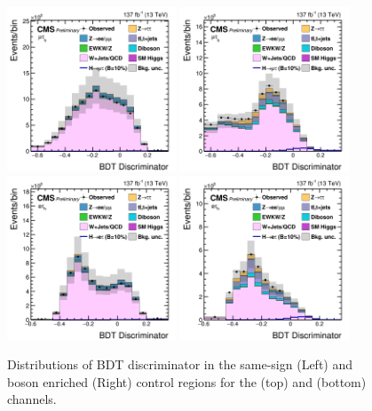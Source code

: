 \begin{figure}[htbp!]
  \centering
  \includegraphics[width=0.45\textwidth]{plots/chapter7/Fake/mutau/SSBDT.png}
  \includegraphics[width=0.45\textwidth]{plots/chapter7/Fake/mutau/WOSBDT.png}
  \includegraphics[width=0.45\textwidth]{plots/chapter7/Fake/etau/SSBDT.png}
  \includegraphics[width=0.45\textwidth]{plots/chapter7/Fake/etau/WOSBDT.png}
  \caption{Distributions of BDT discriminator in the same-sign (Left) and \PW\, boson enriched (Right) control regions for the \Hmuhad (top) and \Hehad (bottom) channels.}
  \label{fig:fake_control_BDT}
\end{figure}

